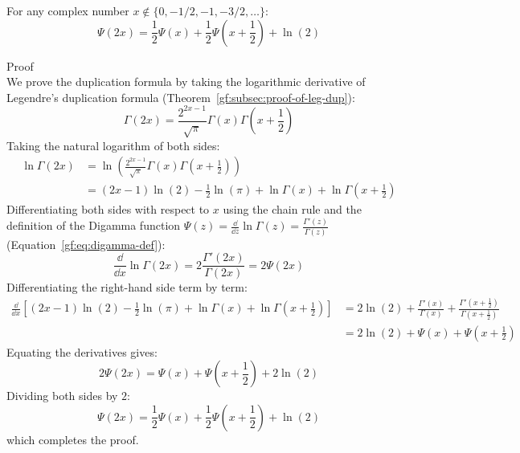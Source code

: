 \documentclass[a4paper]{article}
\begin{document}
    \begin{theorem}\label{gf:thm:digamma-duplication}
        For any complex number $x \notin \{0, -1/2, -1, -3/2, \dots\}$:
        \begin{equation}
            \label{gf:eq:equation14}
            \boxed{
                \Psi(2x) = \frac{1}{2} \Psi(x) + \frac{1}{2} \Psi\left(x + \frac{1}{2}\right) + \ln(2)
            }
        \end{equation}

        Proof
        \\
        We prove the duplication formula by taking the logarithmic derivative of Legendre's duplication formula (Theorem~\ref{gf:subsec:proof-of-leg-dup}):
        \begin{equation*}
            \Gamma(2x) = \frac{2^{2x-1}}{\sqrt{\pi}} \Gamma(x) \Gamma\left(x + \frac{1}{2}\right)
        \end{equation*}
        Taking the natural logarithm of both sides:
        \begin{align*}
            \ln \Gamma(2x) & = \ln\left( \frac{2^{2x-1}}{\sqrt{\pi}} \Gamma(x) \Gamma\left(x + \frac{1}{2}\right) \right) \\
            & = (2x - 1) \ln(2) - \frac{1}{2}\ln(\pi) + \ln \Gamma(x) + \ln \Gamma\left(x + \frac{1}{2}\right)
        \end{align*}
        Differentiating both sides with respect to $x$ using the chain rule and the definition of the Digamma function $\Psi(z) = \frac{\dd}{\dd z} \ln \Gamma(z) = \frac{\Gamma'(z)}{\Gamma(z)}$ (Equation~\ref{gf:eq:digamma-def}):
        \begin{equation*}
            \frac{\dd}{\dd x} \ln \Gamma(2x) = 2 \frac{\Gamma'(2x)}{\Gamma(2x)} = 2 \Psi(2x)
        \end{equation*}
        Differentiating the right-hand side term by term:
        \begin{align*}
            \frac{\dd}{\dd x} \left[ (2x - 1) \ln(2) - \frac{1}{2}\ln(\pi) + \ln \Gamma(x) + \ln \Gamma\left(x + \frac{1}{2}\right) \right] & = 2\ln(2) + \frac{\Gamma'(x)}{\Gamma(x)} + \frac{\Gamma'\left(x + \frac{1}{2}\right)}{\Gamma\left(x + \frac{1}{2}\right)} \\
            & = 2\ln(2) + \Psi(x) + \Psi\left(x + \frac{1}{2}\right)
        \end{align*}
        Equating the derivatives gives:
        \begin{equation*}
            2 \Psi(2x) = \Psi(x) + \Psi\left(x + \frac{1}{2}\right) + 2\ln(2)
        \end{equation*}
        Dividing both sides by $2$:
        \begin{equation*}
            \Psi(2x) = \frac{1}{2} \Psi(x) + \frac{1}{2} \Psi\left(x + \frac{1}{2}\right) + \ln(2)
        \end{equation*}
        which completes the proof.
    \end{theorem}
\end{document}
